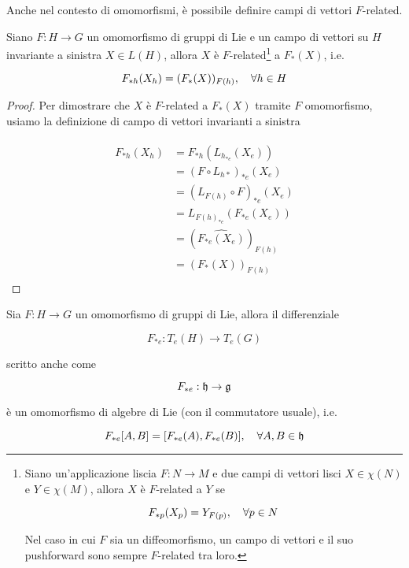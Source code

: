 Anche nel contesto di omomorfismi, è possibile definire campi di vettori $ F $-related.

\begin{definition}[2]
	Siano $ F : H \to G $ un omomorfismo di gruppi di Lie e un campo di vettori su $ H $ invariante a sinistra $ X \in L(H) $, allora $ X $ è $ F $-related\footnote{%
		Siano un'applicazione liscia $ F : N \to M $ e due campi di vettori lisci $ X \in \chi(N) $ e $ Y \in \chi(M) $, allora $ X $ è $ F $-related a $ Y $ se
		
		\begin{equation*}
			F_{*p} (X_{p}) = Y_{F(p)} \qcomma \forall p \in N
		\end{equation*}
	
		Nel caso in cui $ F $ sia un diffeomorfismo, un campo di vettori e il suo pushforward sono sempre $ F $-related tra loro.%
	} a $ F_{*}(X) $, i.e.

	\begin{equation}
		F_{*h} (X_{h}) = (F_{*}(X))_{F(h)} \qcomma \forall h \in H
	\end{equation}
\end{definition}

\begin{proof}
	Per dimostrare che $ X $ è $ F $-related a $ F_{*}(X) $ tramite $ F $ omomorfismo, usiamo la definizione di campo di vettori invarianti a sinistra
	
	\begin{align}
		\begin{split}
			F_{*h} (X_{h}) &= F_{*h} (L_{h_{*e}}(X_{e}))\\
			&= (F \circ L_{h*})_{*e} (X_{e})\\
			&= (L_{F(h)} \circ F)_{*e} (X_{e})\\
			&= L_{F(h)_{*e}} (F_{*e}(X_{e}))\\
			&= (\widehat{ F_{*e}(X_{e}) })_{F(h)}\\
			&= (F_{*}(X))_{F(h)}
		\end{split}
	\end{align}
\end{proof}

\begin{definition}[3]
	Sia $ F : H \to G $ un omomorfismo di gruppi di Lie, allora il differenziale
	
	\begin{equation}
		F_{*e} : T_{e}(H) \to T_{e}(G)
	\end{equation}

	scritto anche come
	
	\begin{equation}
		F_{*e} : \mathfrak{h} \to \mathfrak{g}
	\end{equation}

	è un omomorfismo di algebre di Lie (con il commutatore usuale), i.e.
	
	\begin{equation}
		F_{*e} \comm{A}{B} = \comm{F_{*e} (A)}{F_{*e} (B)} \qcomma \forall A,B \in \h
	\end{equation}
\end{definition}

